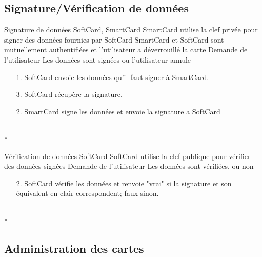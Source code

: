 \documentclass[a4paper,11pt,french]{article}
\begin{document}
\subsection{Signature/Vérification de données}

\fiche
{Signature de données}
	{SoftCard, SmartCard}
    {SmartCard utilise la clef privée pour signer des données fournies par 
    SoftCard}
    { SmartCard et SoftCard sont mutuellement authentifiées et l'utilisateur a
    déverrouillé la carte}
    {Demande de l'utilisateur}
    {Les données sont signées ou l'utilisateur annule}
    {\begin{itemize}
        \item[]
        \item[1.] SoftCard envoie les données qu'il faut signer à SmartCard.
        \item[3.] SoftCard récupère la signature.
    \end{itemize}}
	{\begin{itemize}
        \item[]
        \item[2.] SmartCard signe les données et envoie la signature a SoftCard 
	\end{itemize}
	}
	{}
\flots
    {}
    {}
\\*

\fiche
{Vérification de données}
	{SoftCard}
    {SoftCard utilise la clef publique pour vérifier des données signées}
    {}
    {Demande de l'utilisateur}
    {Les données sont vérifiées, ou non}
    {\begin{itemize}
        \item[]
        \item[2.] SoftCard vérifie les données et renvoie "vrai" si la signature
            et son équivalent en clair correspondent; faux sinon.
    \end{itemize}}
	{\begin{itemize}
        \item[]
	\end{itemize}
	}
	{}
\flots
    {}
    {}
\\*


\subsection{Administration des cartes}
\end{document}

